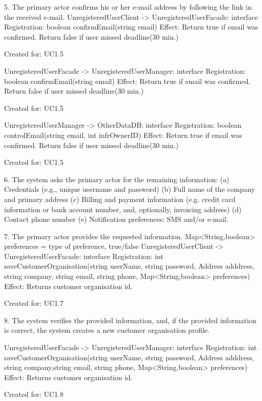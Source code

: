     5. The primary actor confirms his or her e-mail address by following the link in the received
    e-mail.
    UnregisteredUserClient -> UnregisteredUserFacade: interface Registration:
                                         boolean confirmEmail(string email)
            Effect: Return true if email was confirmed. Return false if user missed deadline(30 min.)
            \item Created for: UC1.5
        
        UnregisteredUserFacade -> UnregisteredUserManager: interface Registration:
                                   boolean confirmEmail(string email)
             Effect: Return true if email was confirmed. Return false if user missed deadline(30 min.)
            \item Created for: UC1.5
            
        UnregisteredUserManager -> OtherDataDB: interface Registration:
                                  boolean controlEmail(string email, int infrOwnerID)
             Effect: Return true if email was confirmed. Return false if user missed deadline(30 min.)
            \item Created for: UC1.5
    
    6. The system asks the primary actor for the remaining information:
    (a) Credentials (e.g., unique username and password)
    (b) Full name of the company and primary address
    (c) Billing and payment information (e.g. credit card information or bank account number,
        and, optionally, invoicing address)
    (d) Contact phone number
    (e) Notification preferences: SMS and/or e-mail.            
    
    7. The primary actor provides the requested information.
        Map<String,boolean> preferences = type of preference, true/false
     UnregisteredUserClient -> UnregisteredUserFacade: interface Registration:
                                 int saveCustomerOrganisation(string userName, string password, Address adddress, string company, string 
                                 email, string phone, Map<String,boolean> preferences)
            Effect: Returns customer organisation id.
            \item Created for: UC1.7
    
    8. The system verifies the provided information, and, if the provided information is correct, the
    system creates a new customer organisation profile.

            
        UnregisteredUserFacade -> UnregisteredUserManager: interface Registration:
                                  int saveCustomerOrganisation(string userName, string password, Address adddress, string company,string    
                                  email, string phone, Map<String,boolean> preferences)
             Effect: Returns customer organisation id.
            \item Created for: UC1.8
            
